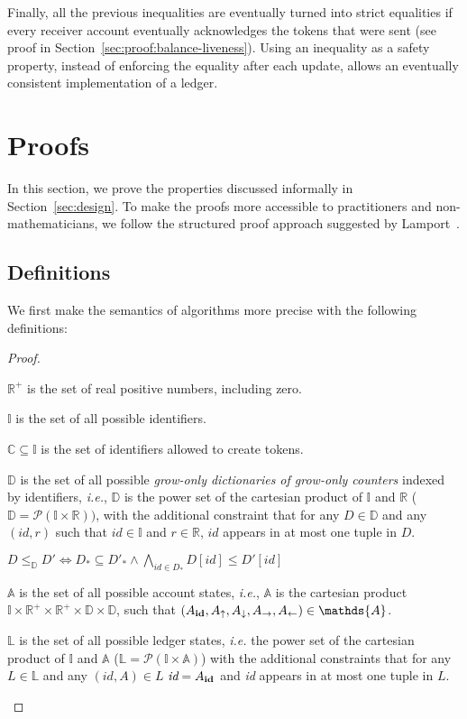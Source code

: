 \documentclass[9pt]{article}   	%
\begin{document}
Finally, all the previous inequalities are eventually turned into strict equalities if every receiver account eventually acknowledges the tokens that were sent (see proof in Section~\ref{sec:proof:balance-liveness}). Using an inequality as a safety property, instead of enforcing the equality after each update, allows an eventually consistent implementation of a ledger.

\section{Proofs}
\label{sec:proofs}

In this section, we prove the properties discussed informally in Section~\ref{sec:design}. To make the proofs more accessible to practitioners and non-mathematicians, we follow the structured proof approach suggested by Lamport~\cite{lamport2012write}.

\subsection{Definitions}

We first make the semantics of algorithms more precise with the following definitions:
\begin{proof}
	\begin{pfenum}
		\item $\mathds{R}^+$ is the set of real positive numbers, including zero.
		\item $\mathds{I}$ is the set of all possible identifiers.
		\item $\mathds{C} \subseteq \mathds{I}$ is the set of identifiers allowed to create tokens.
		\item $\mathds{D}$ is the set of all possible \textit{grow-only dictionaries of grow-only counters} indexed by identifiers, \textit{i.e.}, $\mathds{D}$ is the power set of the cartesian product of $\mathds{I}$ and $\mathds{R}$ ($\mathds{D} = \mathcal{P}(\mathds{I} \times \mathds{R}))$, with the additional constraint that for any $D \in \mathds{D}$ and any $(\textit{id},r)$ such that $\textit{id} \in \mathds{I}$ and $r \in \mathds{R}$, $id$ appears in at most one tuple in $D$.
		\item $D \leq_\mathds{D} D' \Leftrightarrow D_* \subseteq D'_* \wedge \bigwedge\limits_{id \in D_*} D[id] \leq D'[id] $
		\item $\mathds{A}$ is the set of all possible account states, \textit{i.e.}, $\mathds{A}$ is the cartesian product $\mathds{I} \times \mathds{R}^+ \times \mathds{R}^+ \times \mathds{D} \times \mathds{D}$, such that $(A_{\footnotesize \textbf{id}}, A_\uparrow, A_\downarrow, A_\rightarrow, A_\leftarrow) \in \mathds{A}$. 
		\item $\mathds{L}$ is the set of all possible ledger states, \textit{i.e.} the power set of the cartesian product of $\mathds{I}$ and $\mathds{A}$ ($\mathds{L} = \mathcal{P}(\mathds{I} \times \mathds{A})$) with the additional constraints that for any $L \in \mathds{L}$ and any $(\textit{id}, A) \in L$ $\textit{id} = A_{\footnotesize \textbf{id}}$ and \textit{id} appears in at most one tuple in $L$.
	\end{pfenum}
\end{proof}
\end{document}
